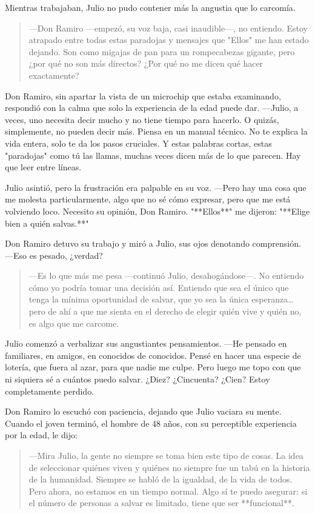 \documentclass[a4paper,12pt]{book}
\begin{document}
Mientras trabajaban, Julio no pudo contener más la angustia que lo carcomía.

\begin{quote}
    —Don Ramiro —empezó, su voz baja, casi inaudible—, no entiendo. Estoy atrapado entre todas estas paradojas y mensajes que "Ellos" me han estado dejando. Son como migajas de pan para un rompecabezas gigante, pero ¿por qué no son más directos? ¿Por qué no me dicen qué hacer exactamente?
\end{quote}

Don Ramiro, sin apartar la vista de un microchip que estaba examinando, respondió con la calma que solo la experiencia de la edad puede dar. —Julio, a veces, uno necesita decir mucho y no tiene tiempo para hacerlo. O quizás, simplemente, no pueden decir más. Piensa en un manual técnico. No te explica la vida entera, solo te da los pasos cruciales. Y estas palabras cortas, estas "paradojas" como tú las llamas, muchas veces dicen más de lo que parecen. Hay que leer entre líneas.

Julio asintió, pero la frustración era palpable en su voz. —Pero hay una cosa que me molesta particularmente, algo que no sé cómo expresar, pero que me está volviendo loco. Necesito su opinión, Don Ramiro. "**Ellos**" me dijeron: "**Elige bien a quién salvas.**"

Don Ramiro detuvo su trabajo y miró a Julio, sus ojos denotando comprensión. —Eso es pesado, ¿verdad?

\begin{quote}
    —Es lo que más me pesa —continuó Julio, desahogándose—. No entiendo cómo yo podría tomar una decisión así. Entiendo que sea el único que tenga la mínima oportunidad de salvar, que yo sea la única esperanza… pero de ahí a que me sienta en el derecho de elegir quién vive y quién no, es algo que me carcome.
\end{quote}

Julio comenzó a verbalizar sus angustiantes pensamientos. —He pensado en familiares, en amigos, en conocidos de conocidos. Pensé en hacer una especie de lotería, que fuera al azar, para que nadie me culpe. Pero luego me topo con que ni siquiera sé a cuántos puedo salvar. ¿Diez? ¿Cincuenta? ¿Cien? Estoy completamente perdido.

Don Ramiro lo escuchó con paciencia, dejando que Julio vaciara su mente. Cuando el joven terminó, el hombre de 48 años, con su perceptible experiencia por la edad, le dijo:

\begin{quote}
    —Mira Julio, la gente no siempre se toma bien este tipo de cosas. La idea de seleccionar quiénes viven y quiénes no siempre fue un tabú en la historia de la humanidad. Siempre se habló de la igualdad, de la vida de todos. Pero ahora, no estamos en un tiempo normal. Algo sí te puedo asegurar: si el número de personas a salvar es limitado, tiene que ser **funcional**.
\end{quote}
\end{document}
